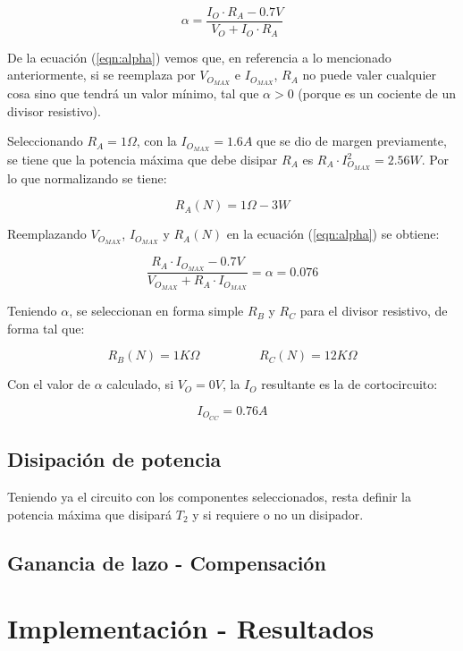 \begin{equation}
\alpha = \frac{I_O \cdot R_A - 0.7V}{V_O + I_O \cdot R_A}
\label{eqn:alpha}
\end{equation}

De la ecuaci\'on (\ref{eqn:alpha}) vemos que, en referencia a lo mencionado anteriormente, si se reemplaza por $V_{O_{MAX}}$ e $I_{O_{MAX}}$, $R_A$ no puede valer cualquier cosa sino que tendr\'a un valor m\'inimo, tal que $\alpha > 0$ (porque es un cociente de un divisor resistivo).\par
Seleccionando $R_A = 1\Omega$, con la $I_{O_{MAX}} = 1.6A$ que se dio de margen previamente, se tiene que la potencia m\'axima que debe disipar $R_A$ es $R_A \cdot I^2_{O_{MAX}} = 2.56W$. Por lo que normalizando se tiene:

$$R_A(N) = 1\Omega - 3W$$

Reemplazando $V_{O_{MAX}}$, $I_{O_{MAX}}$ y $R_A(N)$ en la ecuaci\'on (\ref{eqn:alpha}) se obtiene:

$$\frac{R_A \cdot I_{O_{MAX}}- 0.7V}{V_{O_{MAX}} + R_A \cdot I_{O_{MAX}}} = \alpha = 0.076$$

Teniendo $\alpha$, se seleccionan en forma simple $R_B$ y $R_C$ para el divisor resistivo, de forma tal que:

$$R_B(N) = 1K\Omega \hspace{2cm} R_C(N) = 12K\Omega$$

Con el valor de $\alpha$ calculado, si $V_O = 0V$, la $I_O$ resultante es la de cortocircuito:

$$I_{O_{CC}} = 0.76A$$


\subsection{Disipaci\'on de potencia}

Teniendo ya el circuito con los componentes seleccionados, resta definir la potencia m\'axima que disipar\'a $T_2$ y si requiere o no un disipador. 

\subsection{Ganancia de lazo - Compensaci\'on}

\newpage

\section{Implementaci\'on - Resultados}

